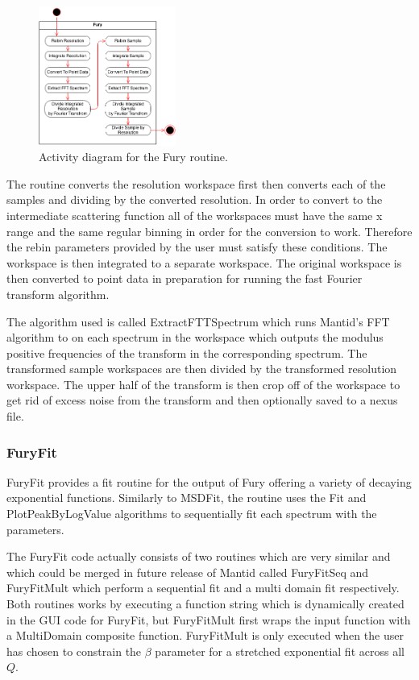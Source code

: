\documentclass[paper=a4, fontsize=11pt]{scrartcl}	%
\numberwithin{equation}{section}															%
\numberwithin{figure}{section}																%
\numberwithin{table}{section}																%
\begin{document}
\begin{figure}[H]
\centering
\includegraphics[width=0.4\textwidth]{img/uml/activity_diagrams/Fury_activity.png}
\caption{Activity diagram for the Fury routine.}
\label{fig:fury-activity-diagram}
\end{figure}


The routine converts the resolution workspace first then converts each of the samples and dividing by the converted resolution. In order to convert to the intermediate scattering function all of the workspaces must have the same x range and the same regular binning in order for the conversion to work. Therefore the rebin parameters provided by the user must satisfy these conditions. The workspace is then integrated to a separate workspace. The original workspace is then converted to point data in preparation for running the fast Fourier transform algorithm.

The algorithm used is called ExtractFTTSpectrum which runs Mantid's FFT algorithm to on each spectrum in the workspace which outputs the modulus positive frequencies of the transform in the corresponding spectrum. The transformed sample workspaces are then divided by the transformed resolution workspace. The upper half of the transform is then crop off of the workspace to get rid of excess noise from the transform and then optionally saved to a nexus file.

\subsubsection{FuryFit}
FuryFit provides a fit routine for the output of Fury offering a variety of decaying exponential functions. Similarly to MSDFit, the routine uses the Fit and PlotPeakByLogValue algorithms to sequentially fit each spectrum with the parameters.

The FuryFit code actually consists of two routines which are very similar and which could be merged in future release of Mantid called FuryFitSeq and FuryFitMult which perform a sequential fit and a multi domain fit respectively. Both routines works by executing a function string which is dynamically created in the GUI code for FuryFit, but FuryFitMult first wraps the input function with a MultiDomain composite function. FuryFitMult is only executed when the user has chosen to constrain the $\beta$ parameter for a stretched exponential fit across all $Q$.
\end{document}
